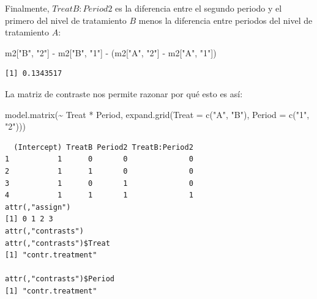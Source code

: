 \documentclass[
  12pt,
  a4paper,
  extrafontsizes,
  onecolumn,
  openright,
  table]{memoir}
\newenvironment{Shaded}{\begin{snugshade}}{\end{snugshade}}
\newcommand{\AttributeTok}[1]{\textcolor[rgb]{0.40,0.45,0.13}{#1}}
\newcommand{\FunctionTok}[1]{\textcolor[rgb]{0.28,0.35,0.67}{#1}}
\newcommand{\NormalTok}[1]{\textcolor[rgb]{0.00,0.23,0.31}{#1}}
\newcommand{\SpecialCharTok}[1]{\textcolor[rgb]{0.37,0.37,0.37}{#1}}
\newcommand{\StringTok}[1]{\textcolor[rgb]{0.13,0.47,0.30}{#1}}
\begin{document}
Finalmente, \(TreatB:Period2\) es la diferencia entre el segundo periodo
y el primero del nivel de tratamiento \(B\) menos la diferencia entre
periodos del nivel de tratamiento \(A\):

\scriptsize

\begin{Shaded}
\begin{Highlighting}[]
\NormalTok{m2[}\StringTok{"B"}\NormalTok{, }\StringTok{"2"}\NormalTok{] }\SpecialCharTok{{-}}\NormalTok{ m2[}\StringTok{"B"}\NormalTok{, }\StringTok{"1"}\NormalTok{] }\SpecialCharTok{{-}}\NormalTok{ (m2[}\StringTok{"A"}\NormalTok{, }\StringTok{"2"}\NormalTok{] }\SpecialCharTok{{-}}\NormalTok{ m2[}\StringTok{"A"}\NormalTok{, }\StringTok{"1"}\NormalTok{])}
\end{Highlighting}
\end{Shaded}

\begin{verbatim}
[1] 0.1343517
\end{verbatim}

\normalsize

La matriz de contraste nos permite razonar por qué esto es así:

\scriptsize

\begin{Shaded}
\begin{Highlighting}[]
\FunctionTok{model.matrix}\NormalTok{(}\SpecialCharTok{\textasciitilde{}}\NormalTok{ Treat }\SpecialCharTok{*}\NormalTok{ Period, }\FunctionTok{expand.grid}\NormalTok{(}\AttributeTok{Treat =} \FunctionTok{c}\NormalTok{(}\StringTok{"A"}\NormalTok{, }\StringTok{"B"}\NormalTok{), }\AttributeTok{Period =} \FunctionTok{c}\NormalTok{(}\StringTok{"1"}\NormalTok{, }\StringTok{"2"}\NormalTok{)))}
\end{Highlighting}
\end{Shaded}

\begin{verbatim}
  (Intercept) TreatB Period2 TreatB:Period2
1           1      0       0              0
2           1      1       0              0
3           1      0       1              0
4           1      1       1              1
attr(,"assign")
[1] 0 1 2 3
attr(,"contrasts")
attr(,"contrasts")$Treat
[1] "contr.treatment"

attr(,"contrasts")$Period
[1] "contr.treatment"
\end{verbatim}

\normalsize
\end{document}
